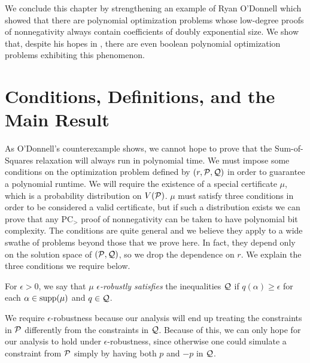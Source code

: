 We conclude this chapter by strengthening an example of Ryan O'Donnell which showed that there are polynomial optimization problems whose low-degree proofs of nonnegativity always contain coefficients of doubly exponential size. We show that, despite his hopes in \cite{ODon16}, there are even boolean polynomial optimization problems exhibiting this phenomenon. 

\section{Conditions, Definitions, and the Main Result}
As O'Donnell's counterexample shows, we cannot hope to prove that the Sum-of-Squares relaxation will always run in polynomial time. We must impose some conditions on the optimization problem defined by $(r, \mathcal P, \mathcal Q)$ in order to guarantee a polynomial runtime. 
We will require the existence of a special certificate $\mu$, which is a probability distribution on $V(\mathcal P)$. 
$\mu$ must satisfy three conditions in order to be considered a valid certificate, but if such a distribution exists we can prove that any PC$_>$ proof of nonnegativity can be taken to have polynomial bit complexity. The conditions are quite general and we believe they apply to a wide swathe of problems beyond those that we prove here. In fact, they depend only on the solution space of $(\mathcal P, \mathcal Q)$, so we drop the dependence on $r$. We explain the three conditions we require below.

\begin{definition}
For $\epsilon > 0$, we say that $\mu$ \emph{$\epsilon$-robustly satisfies} the inequalities $\mathcal Q$ if $q(\alpha) \geq \epsilon$ for each $\alpha \in \operatorname{supp}(\mu)$ and $q \in \mathcal Q$. 
\end{definition}
We require $\epsilon$-robustness because our analysis will end up treating the constraints in $\mathcal P$ differently from the constraints in $\mathcal Q$.
Because of this, we can only hope for our analysis to hold under $\epsilon$-robustness, since otherwise one could simulate a constraint from $\mathcal P$ simply by having both $p$ and $-p$ in $\mathcal Q$. 

